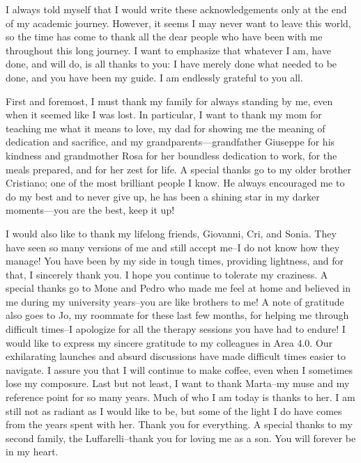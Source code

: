 I always told myself that I would write these acknowledgements only at the end of my academic journey.
 However, it seems I may never want to leave this world, 
 so the time has come to thank all the dear people who have been with me throughout this long journey. 
 I want to emphasize that whatever I am, have done, and will do, is all thanks to you: 
 I have merely done what needed to be done, and you have been my guide. 
 I am endlessly grateful to you all.

First and foremost, 
 I must thank my family for always standing by me, 
 even when it seemed like I was lost. 
 In particular, I want to thank my mom for teaching me what it means to love, 
 my dad for showing me the meaning of dedication and sacrifice, 
 and my grandparents—grandfather Giuseppe for his kindness and grandmother Rosa for her boundless dedication to work, for the meals prepared, and for her zest for life. 
 A special thanks go to my older brother Cristiano; 
 one of the most brilliant people I know.
 He always encouraged me to do my best and to never give up, 
 he has been a shining star in my darker moments—you are the best, keep it up!

I would also like to thank my lifelong friends, 
 Giovanni, Cri, and Sonia. 
 They have seen so many versions of me and still accept me--I do not know how they manage! 
 You have been by my side in tough times, providing lightness, and for that, I sincerely thank you. 
 I hope you continue to tolerate my craziness.
%
A special thanks go to Mone and Pedro who made me feel at home and believed in me during my university years--you are like brothers to me! 
%
A note of gratitude also goes to Jo, 
 my roommate for these last few months, 
 for helping me through difficult times--I apologize for all the therapy sessions you have had to endure!
%
I would like to express my sincere gratitude to my colleagues in Area 4.0.
 Our exhilarating launches and absurd discussions have made difficult times easier to navigate. 
 I assure you that I will continue to make coffee, even when I sometimes lose my composure.
%
Last but not least, I want to thank Marta--my muse and my reference point for so many years. 
 Much of who I am today is thanks to her. 
 I am still not as radiant as I would like to be,
 but some of the light I do have comes from the years spent with her. 
 Thank you for everything.
%
A special thanks to my second family, the Luffarelli--thank you for loving me as a son. 
 You will forever be in my heart.
%

